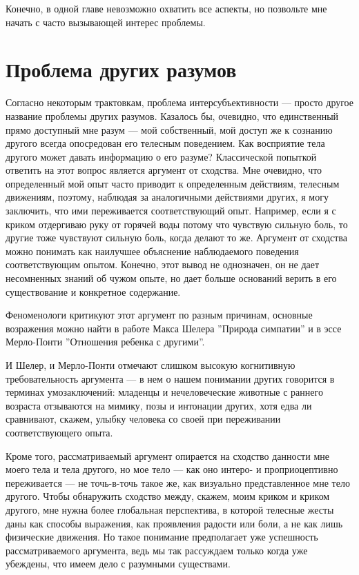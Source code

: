 \documentclass[11pt]{book}
\begin{document}
Конечно, в одной главе невозможно охватить все аспекты, но позвольте мне начать с часто вызывающей интерес проблемы.

\section{Проблема других разумов}

Согласно некоторым трактовкам, проблема интерсубъективности --- просто другое название проблемы других разумов. Казалось бы, очевидно, что единственный прямо доступный мне разум --- мой собственный, мой доступ же к сознанию другого всегда опосредован его телесным поведением. Как восприятие тела другого может давать информацию о его разуме? Классической попыткой ответить на этот вопрос является аргумент от сходства. Мне очевидно, что определенный мой опыт часто приводит к определенным действиям, телесным движениям, поэтому, наблюдая за аналогичными действиями других, я могу заключить, что ими переживается соответствующий опыт. Например, если я с криком отдергиваю руку от горячей воды потому что чувствую сильную боль, то другие тоже чувствуют сильную боль, когда делают то же. Аргумент от сходства можно понимать как наилучшее объяснение наблюдаемого поведения соответствующим опытом. Конечно, этот вывод не однозначен, он не дает несомненных знаний об чужом опыте, но дает больше оснований верить в его существование и конкретное содержание.

Феноменологи критикуют этот аргумент по разным причинам, основные возражения можно найти в работе Макса Шелера ''Природа симпатии'' и в эссе Мерло-Понти ''Отношения ребенка с другими''.

И Шелер, и Мерло-Понти отмечают слишком высокую когнитивную требовательность аргумента --- в нем о нашем понимании других говорится в терминах умозаключений: младенцы и нечеловеческие животные с раннего возраста отзываются на мимику, позы и интонации других, хотя едва ли сравнивают, скажем, улыбку человека со своей при переживании соответствующего опыта.

Кроме того, рассматриваемый аргумент опирается на сходство данности мне моего тела и тела другого, но мое тело --- как оно интеро- и проприоцептивно переживается --- не точь-в-точь такое же, как визуально представленное мне тело другого. Чтобы обнаружить сходство между, скажем, моим криком и криком другого, мне нужна более глобальная перспектива, в которой телесные жесты даны как способы выражения, как проявления радости или боли, а не как лишь физические движения. Но такое понимание предполагает уже успешность рассматриваемого аргумента, ведь мы так рассуждаем только когда уже убеждены, что имеем дело с разумными существами.
\end{document}
